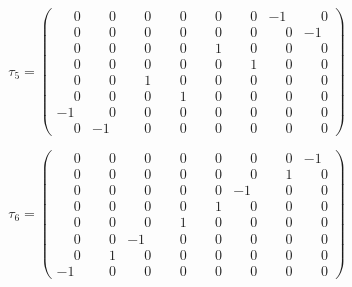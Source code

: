 \documentclass[10pt]{article}
\begin{document}
\[
\tau_{5} = \left(\begin{smallmatrix}
\phantom{-}0 & \phantom{-}0 & \phantom{-}0 & \phantom{-}0 & \phantom{-}0 & \phantom{-}0 & -1 & \phantom{-}0 \\
\phantom{-}0 & \phantom{-}0 & \phantom{-}0 & \phantom{-}0 & \phantom{-}0 & \phantom{-}0 & \phantom{-}0 & -1 \\
\phantom{-}0 & \phantom{-}0 & \phantom{-}0 & \phantom{-}0 & \phantom{-}1 & \phantom{-}0 & \phantom{-}0 & \phantom{-}0 \\
\phantom{-}0 & \phantom{-}0 & \phantom{-}0 & \phantom{-}0 & \phantom{-}0 & \phantom{-}1 & \phantom{-}0 & \phantom{-}0 \\
\phantom{-}0 & \phantom{-}0 & \phantom{-}1 & \phantom{-}0 & \phantom{-}0 & \phantom{-}0 & \phantom{-}0 & \phantom{-}0 \\
\phantom{-}0 & \phantom{-}0 & \phantom{-}0 & \phantom{-}1 & \phantom{-}0 & \phantom{-}0 & \phantom{-}0 & \phantom{-}0 \\
-1 & \phantom{-}0 & \phantom{-}0 & \phantom{-}0 & \phantom{-}0 & \phantom{-}0 & \phantom{-}0 & \phantom{-}0 \\
\phantom{-}0 & -1 & \phantom{-}0 & \phantom{-}0 & \phantom{-}0 & \phantom{-}0 & \phantom{-}0 & \phantom{-}0
\end{smallmatrix}\right)
\]

\[
\tau_{6} = \left(\begin{smallmatrix}
\phantom{-}0 & \phantom{-}0 & \phantom{-}0 & \phantom{-}0 & \phantom{-}0 & \phantom{-}0 & \phantom{-}0 & -1 \\
\phantom{-}0 & \phantom{-}0 & \phantom{-}0 & \phantom{-}0 & \phantom{-}0 & \phantom{-}0 & \phantom{-}1 & \phantom{-}0 \\
\phantom{-}0 & \phantom{-}0 & \phantom{-}0 & \phantom{-}0 & \phantom{-}0 & -1 & \phantom{-}0 & \phantom{-}0 \\
\phantom{-}0 & \phantom{-}0 & \phantom{-}0 & \phantom{-}0 & \phantom{-}1 & \phantom{-}0 & \phantom{-}0 & \phantom{-}0 \\
\phantom{-}0 & \phantom{-}0 & \phantom{-}0 & \phantom{-}1 & \phantom{-}0 & \phantom{-}0 & \phantom{-}0 & \phantom{-}0 \\
\phantom{-}0 & \phantom{-}0 & -1 & \phantom{-}0 & \phantom{-}0 & \phantom{-}0 & \phantom{-}0 & \phantom{-}0 \\
\phantom{-}0 & \phantom{-}1 & \phantom{-}0 & \phantom{-}0 & \phantom{-}0 & \phantom{-}0 & \phantom{-}0 & \phantom{-}0 \\
-1 & \phantom{-}0 & \phantom{-}0 & \phantom{-}0 & \phantom{-}0 & \phantom{-}0 & \phantom{-}0 & \phantom{-}0
\end{smallmatrix}\right)
\]
\end{document}
